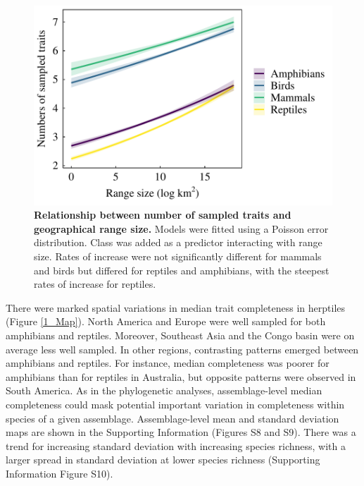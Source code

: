 \begin{figure}[h!]
\centering
\includegraphics[scale=0.7]{figures/Chapter1/Figure_4}
\caption[Relationship between number of sampled traits and geographical range size]{\textbf{Relationship between number of sampled traits and geographical range size.} Models were fitted using a Poisson error distribution. Class was added as a predictor interacting with range size. Rates of increase were not significantly different for mammals and birds but differed for reptiles and amphibians, with the steepest rates of increase for reptiles.}
\label{1_Range_size}
\end{figure}

There were marked spatial variations in median trait completeness in herptiles (Figure \ref{1_Map}). North America and Europe were well sampled for both amphibians and reptiles. Moreover, Southeast Asia and the Congo basin were on average less well sampled. In other regions, contrasting patterns emerged between amphibians and reptiles. For instance, median completeness was poorer for amphibians than for reptiles in Australia, but opposite patterns were observed in South America. As in the phylogenetic analyses, assemblage-level median completeness could mask potential important variation in completeness within species of a given assemblage. Assemblage-level mean and standard deviation maps are shown in the Supporting Information (Figures S8 and S9). There was a trend for increasing standard deviation with increasing species richness, with a larger spread in standard deviation at lower species richness (Supporting Information Figure S10).

